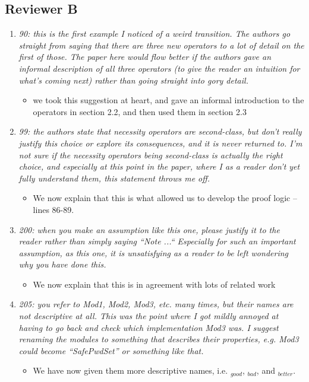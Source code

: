 \documentclass[11pt]{amsart}
\begin{document}
\subsection{Reviewer B}
\begin{enumerate}
\item
\emph{
90: this is the first example I noticed of a weird transition. The authors go straight from saying that there are three new operators to a lot of detail on the first of those. The paper here would flow better if the authors gave an informal description of all three operators (to give the reader an intuition for what’s coming next) rather than going straight into gory detail.
}
\begin{itemize}
\item  
we took this suggestion at heart, and gave an informal introduction to the operators in section 2.2, and then used them in section 2.3 
\end{itemize}

\item
\emph{
99: the authors state that necessity operators are second-class, but don’t really justify this choice or explore its consequences, and it is never returned to. I’m not sure if the necessity operators being second-class is actually the right choice, and especially at this point in the paper, where I as a reader don’t yet fully understand them, this statement throws me off.
}
\begin{itemize}
\item  
We now explain that this is what allowed us to develop the proof logic -- lines 86-89.
\end{itemize}

\item
\emph{
200: when you make an assumption like this one, please justify it to the reader rather than simply saying “Note ...“ Especially for such an important assumption, as this one, it is unsatisfying as a reader to be left wondering why you have done this.}
\begin{itemize}
\item  
We now explain that this is in agreement with lots of related work
\end{itemize}

\item
\emph{
205: you refer to Mod1, Mod2, Mod3, etc. many times, but their names are not descriptive at all. This was the point where I got mildly annoyed at having to go back and check which implementation Mod3 was. I suggest renaming the modules to something that describes their properties, e.g. Mod3 could become “SafePwdSet” or something like that.}
\begin{itemize}
\item  
 We have now given them more descriptive names, i.e. $_{good}$, $_{bad}$, and $_{better}$.
\end{itemize}


\end{enumerate}
\end{document}
